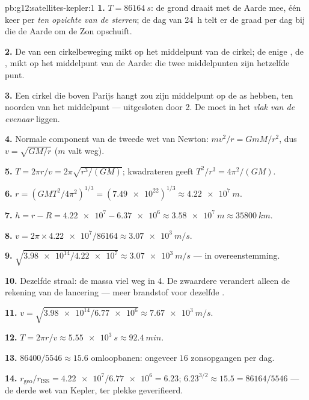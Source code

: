 \begin{solution}{pb:g12:satellites-kepler:1}
\textbf{1.} $T = \qty{86164}{s}$: de grond draait met de Aarde mee, één keer
per  \emph{ten opzichte van de sterren}; de dag van \qty{24}{h}
telt er de graad per dag bij die de Aarde om de Zon opschuift.

\textbf{2.} De  van een cirkelbeweging mikt op het
middelpunt van de cirkel; de enige , de , mikt op het
middelpunt van de Aarde: die twee middelpunten zijn hetzelfde punt.

\textbf{3.} Een cirkel die boven Parijs hangt zou zijn middelpunt op de as
hebben, ten noorden van het middelpunt --- uitgesloten door 2. De 
moet in het \emph{vlak van de evenaar} liggen.

\textbf{4.} Normale component van de tweede wet van Newton:
$m v^2/r = GmM/r^2$, dus $v = \sqrt{GM/r}$ ($m$ valt weg).

\textbf{5.} $T = 2\pi r/v = 2\pi\sqrt{r^3/(GM)}$; kwadrateren geeft
$T^2/r^3 = 4\pi^2/(GM)$.

\textbf{6.} $r = \left(GMT^2/4\pi^2\right)^{1/3} = (\num{7.49e22})^{1/3}
\approx \qty{4.22e7}{m}$.

\textbf{7.} $h = r - R = \num{4.22e7} - \num{6.37e6} \approx
\qty{3.58e7}{m} \approx \qty{35800}{km}$.

\textbf{8.} $v = 2\pi \times \num{4.22e7}/\num{86164} \approx
\qty{3.07e3}{m/s}$.

\textbf{9.} $\sqrt{\num{3.98e14}/\num{4.22e7}} \approx \qty{3.07e3}{m/s}$ ---
in overeenstemming.

\textbf{10.} Dezelfde straal: de massa viel weg in 4. De zwaardere 
verandert alleen de rekening van de lancering --- meer brandstof voor
dezelfde .

\textbf{11.} $v = \sqrt{\num{3.98e14}/\num{6.77e6}} \approx
\qty{7.67e3}{m/s}$.

\textbf{12.} $T = 2\pi r/v \approx \qty{5.55e3}{s} \approx \qty{92.4}{min}$.

\textbf{13.} $\num{86400}/5546 \approx 15.6$ omloopbanen: ongeveer $16$
zonsopgangen per dag.

\textbf{14.} $r_{\text{geo}}/r_{\text{ISS}} = \num{4.22e7}/\num{6.77e6}
= 6.23$; $6.23^{3/2} \approx 15.5 = \num{86164}/5546$ --- de derde wet van
Kepler, ter plekke geverifieerd.


\end{solution}
